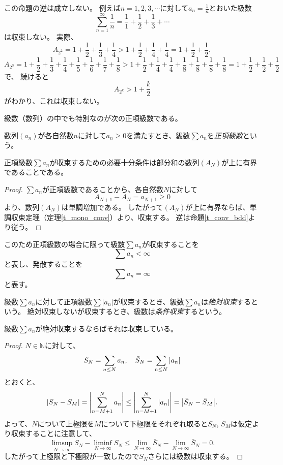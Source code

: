 \begin{remark}
\label{t_harm_ser}
この命題の逆は成立しない。
例えば$n = 1, 2, 3, \cdots$に対して$a_n = \frac{1}{n}$とおいた級数
$$
\sum_{n = 1}^\infty \frac{1}{n} = \frac{1}{1}+\frac{1}{2}+\frac{1}{3}+\cdots
$$
は収束しない。
実際、
$$
A_{2^2} = 1+\frac{1}{2}+\frac{1}{3}+\frac{1}{4} > 1+\frac{1}{2}+\frac{1}{4}+\frac{1}{4} = 1+\frac{1}{2}+\frac{1}{2},
$$
$$
A_{2^3} = 1+\frac{1}{2}+\frac{1}{3}+\frac{1}{4}+\frac{1}{5}+\frac{1}{6}+\frac{1}{7}+\frac{1}{8} > 1+\frac{1}{2}+\frac{1}{4}+\frac{1}{4}+\frac{1}{8}+\frac{1}{8}+\frac{1}{8}+\frac{1}{8} = 1+\frac{1}{2}+\frac{1}{2}+\frac{1}{2}
$$
で、
続けると
$$
A_{2^k} > 1+\frac{k}{2}
$$
がわかり、これは収束しない。
\end{remark}

級数（数列）の中でも特別なのが次の正項級数である。

\begin{definition}[正項級数]
数列$(a_n)$が各自然数$n$に対して$a_n \ge 0$を満たすとき、級数$\sum a_n$を\emph{正項級数}という。
\end{definition}

\begin{proposition}
正項級数$\sum a_n$が収束するための必要十分条件は部分和の数列$(A_N)$が上に有界であることである。
\end{proposition}

\begin{proof}
$\sum a_n$が正項級数であることから、各自然数$N$に対して
$$
A_{N+1}-A_N = a_{N+1} \ge 0
$$
より、数列$(A_N)$は単調増加である。
したがって$(A_N)$が上に有界ならば、単調収束定理（定理\ref{t_mono_conv}）より、収束する。
逆は命題\ref{t_conv_bdd}より従う。
\end{proof}

このため正項級数の場合に限って級数$\sum a_n$が収束することを
$$
\sum a_n < \infty
$$
と表し、発散することを
$$
\sum a_n = \infty
$$
と表す。

\begin{definition}[級数の絶対収束と条件収束]
級数$\sum a_n$に対して正項級数$\sum |a_n|$が収束するとき、級数$\sum a_n$は\emph{絶対収束}するという。
絶対収束しないが収束するとき、級数は\emph{条件収束}するという。
\end{definition}

\begin{proposition}
級数$\sum a_n$が絶対収束するならばそれは収束している。
\end{proposition}

\begin{proof}
$N \in \mathbb{N}$に対して、
$$
S_N = \sum_{n \le N} a_n,
\quad \bar{S}_N = \sum_{n \le N} \abs{a_n}
$$
とおくと、
$$
\abs{S_N-S_M} = \abs{\sum_{n = M+1}^N a_n} \le \abs{\sum_{n = M+1}^N \abs{a_n}} = \abs{\bar{S}_N-\bar{S}_M}.
$$
よって、$N$について上極限を$M$について下極限をそれぞれ取ると$\bar{S}_N$, $\bar{S}_M$は仮定より収束することに注意して、
$$
\limsup_{N \to \infty}S_N-\liminf_{N \to \infty}S_N \le \lim_{N \to \infty}\bar{S}_N-\lim_{N \to \infty}\bar{S}_N = 0.
$$
したがって上極限と下極限が一致したので$S_N$さらには級数は収束する。
\end{proof}

